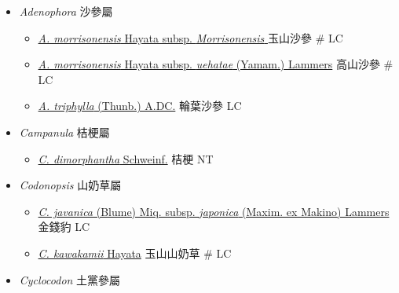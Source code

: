 
  \begin{itemize}
 \item[] \textit{Adenophora} 沙參屬
                                
  \begin{itemize}
        \item[] \href{http://www.theplantlist.org/tpl1.1/search?q=Adenophora+morrisonensis+subsp.+Morrisonensis}{\textit{A. morrisonensis} Hayata subsp. \textit{Morrisonensis} }   玉山沙參  \# LC
        \item[] \href{http://www.theplantlist.org/tpl1.1/search?q=Adenophora+morrisonensis+subsp.+uehatae}{\textit{A. morrisonensis} Hayata subsp. \textit{uehatae} (Yamam.) Lammers}   高山沙參  \# LC
        \item[] \href{http://www.theplantlist.org/tpl1.1/search?q=Adenophora+triphylla}{\textit{A. triphylla} (Thunb.) A.DC.}   輪葉沙參   LC
  \end{itemize}
 \item[] \textit{Campanula} 桔梗屬
                                
  \begin{itemize}
        \item[] \href{http://www.theplantlist.org/tpl1.1/search?q=Campanula+dimorphantha}{\textit{C. dimorphantha} Schweinf.}   桔梗   NT
  \end{itemize}
 \item[] \textit{Codonopsis} 山奶草屬
                                
  \begin{itemize}
        \item[] \href{http://www.theplantlist.org/tpl1.1/search?q=Codonopsis+javanica+subsp.+japonica}{\textit{C. javanica} (Blume) Miq. subsp. \textit{japonica} (Maxim. ex Makino) Lammers}   金錢豹   LC
        \item[] \href{http://www.theplantlist.org/tpl1.1/search?q=Codonopsis+kawakamii}{\textit{C. kawakamii} Hayata}   玉山山奶草  \# LC
  \end{itemize}
 \item[] \textit{Cyclocodon} 土黨參屬
                                

\end{itemize}
